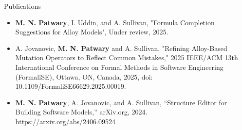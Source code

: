 \begin{rSection}{Publications}
  \begin{itemize}[noitemsep]
    \item \textbf{M. N. Patwary}, I. Uddin, and A. Sullivan, "Formula Completion Suggestions for Alloy Models", Under review, 2025.
    \item A. Jovanovic, \textbf{M. N. Patwary} and A. Sullivan, "Refining Alloy-Based Mutation Operators to Reflect Common Mistakes," 2025 IEEE/ACM 13th International Conference on Formal Methods in Software Engineering (FormaliSE), Ottawa, ON, Canada, 2025, doi: 10.1109/FormaliSE66629.2025.00019.
    \item \textbf{M. N. Patwary}, A. Jovanovic, and A. Sullivan, “Structure Editor for Building Software Models,” arXiv.org, 2024. https://arxiv.org/abs/2406.09524
  \end{itemize}

\end{rSection}

